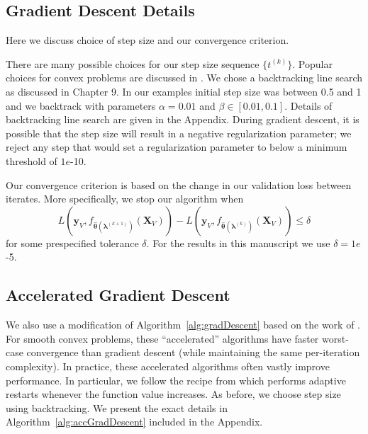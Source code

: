 \documentclass[12pt,letterpaper]{article}
\DeclareMathOperator*{\argmin}{arg\,min}
\begin{document}
%

\subsection{Gradient Descent Details}\label{sec:alg_details}
Here we discuss choice of step size and our convergence criterion.

There are many possible choices for our step size sequence $\{t^{(k)}\}$. Popular choices for convex problems are discussed in \citet{boyd2004convex}. We chose a backtracking line search as discussed in Chapter 9. In our examples initial step size was between 0.5 and 1 and we backtrack with parameters $\alpha = 0.01$ and $\beta \in [0.01, 0.1]$. Details of backtracking line search are given in the Appendix. During gradient descent, it is possible that the step size will result in a negative regularization parameter; we reject any step that would set a regularization parameter to below a minimum threshold of $1e$-10.

Our convergence criterion is based on the change in our validation loss between iterates. More specifically, we stop our algorithm when
\[
L \left( \boldsymbol{y}_V, f_{\hat{\boldsymbol \theta}(\boldsymbol{\lambda}^{(k+1)})}(\boldsymbol{X}_V)\right) -
L \left( \boldsymbol{y}_V, f_{\hat{\boldsymbol \theta}(\boldsymbol{\lambda}^{(k)})}(\boldsymbol{X}_V)\right) \leq \delta
\]
for some prespecified tolerance $\delta$. For the results in this manuscript we use $\delta = 1e$-5.

\subsection{Accelerated Gradient Descent}
We also use a modification of Algorithm~\ref{alg:gradDescent} based on the work of \citet{nesterov1983method}. For smooth convex problems, these ``accelerated'' algorithms have faster worst-case convergence than gradient descent (while maintaining the same per-iteration complexity). In practice, these accelerated algorithms often vastly improve performance. In particular, we follow the recipe from \citet{o2013adaptive} which performs adaptive restarts whenever the function value increases. As before, we choose step size using backtracking. We present the exact details in Algorithm~\ref{alg:accGradDescent} included in the Appendix.
\end{document}
